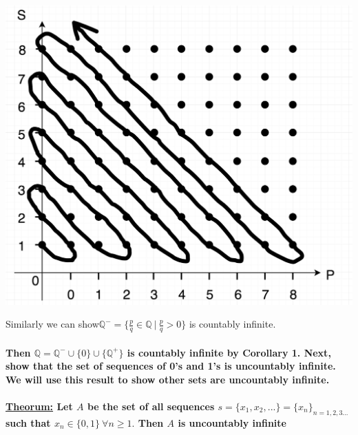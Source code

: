 \documentclass[10pt,a4paper]{article}
\begin{document}
\begin{minipage}[b]{0.35\linewidth}
\includegraphics[scale=0.07]{images/3}
\end{minipage}
\hfill
\begin{minipage}[b]{0.65\linewidth}
\normalsize
Similarly we can show\newline $\mathbb{Q}^{-} = \lbrace \frac{p}{q} \in \mathbb{Q} \ | \ \frac{p}{q} > 0 \rbrace$ \newline is countably infinite.\newline
\linebreak
\linebreak
\linebreak
\end{minipage}

\paragraph{Then $\mathbb{Q} = \mathbb{Q}^{-} \cup \lbrace 0 \rbrace \cup \lbrace \mathbb{Q}^{+} \rbrace$ is countably infinite by Corollary 1.\newline 
Next, show that the set of sequences of 0's and 1's is uncountably infinite. We will use this result to show other sets are uncountably infinite.}

\paragraph{\underline{Theorum:} Let $A$ be the set of all sequences $s = \lbrace x_{1},x_{2},...\rbrace = \lbrace x_{n} \rbrace _{n = 1,2,3...}$ such that $x_{n} \in \lbrace 0,1 \rbrace \ \forall n \geq 1.$ Then $A$ is uncountably infinite}
\end{document}
